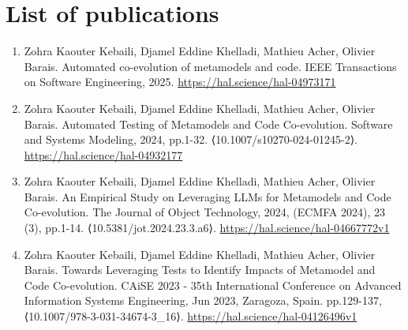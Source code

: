 \section{List of publications}

\begin{enumerate}
	\item Zohra Kaouter Kebaili, Djamel Eddine Khelladi, Mathieu Acher, Olivier Barais. Automated co-evolution of metamodels and code. IEEE Transactions on Software Engineering, 2025. %
	\url{https://hal.science/hal-04973171}

	
	\item	Zohra Kaouter Kebaili, Djamel Eddine Khelladi, Mathieu Acher, Olivier Barais. Automated Testing of Metamodels and Code Co-evolution. Software and Systems Modeling, 2024, pp.1-32. ⟨10.1007/s10270-024-01245-2⟩. %
	\url{https://hal.science/hal-04932177}
	
\item	 Zohra Kaouter Kebaili, Djamel Eddine Khelladi, Mathieu Acher, Olivier Barais. An Empirical Study on Leveraging LLMs for Metamodels and Code Co-evolution. The Journal of Object Technology, 2024, (ECMFA 2024), 23 (3), pp.1-14. ⟨10.5381/jot.2024.23.3.a6⟩. %
	\url{https://hal.science/hal-04667772v1}
	
	\item Zohra Kaouter Kebaili, Djamel Eddine Khelladi, Mathieu Acher, Olivier Barais. Towards Leveraging Tests to Identify Impacts of Metamodel and Code Co-evolution. CAiSE 2023 - 35th International Conference on Advanced Information Systems Engineering, Jun 2023, Zaragoza, Spain. pp.129-137, ⟨10.1007/978-3-031-34674-3\_16⟩. %
	\url{https://hal.science/hal-04126496v1}
\end{enumerate}


